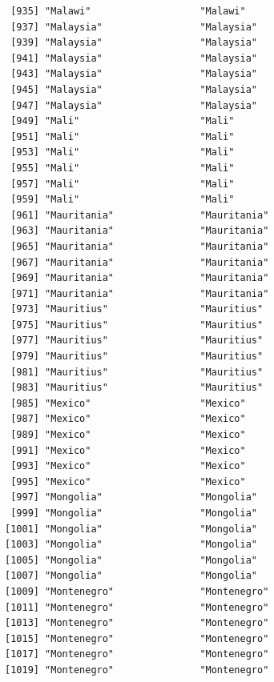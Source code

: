 \documentclass[
  letterpaper,
  DIV=11,
  numbers=noendperiod]{scrreprt}
\begin{document}
\begin{verbatim}
 [935] "Malawi"                   "Malawi"                  
 [937] "Malaysia"                 "Malaysia"                
 [939] "Malaysia"                 "Malaysia"                
 [941] "Malaysia"                 "Malaysia"                
 [943] "Malaysia"                 "Malaysia"                
 [945] "Malaysia"                 "Malaysia"                
 [947] "Malaysia"                 "Malaysia"                
 [949] "Mali"                     "Mali"                    
 [951] "Mali"                     "Mali"                    
 [953] "Mali"                     "Mali"                    
 [955] "Mali"                     "Mali"                    
 [957] "Mali"                     "Mali"                    
 [959] "Mali"                     "Mali"                    
 [961] "Mauritania"               "Mauritania"              
 [963] "Mauritania"               "Mauritania"              
 [965] "Mauritania"               "Mauritania"              
 [967] "Mauritania"               "Mauritania"              
 [969] "Mauritania"               "Mauritania"              
 [971] "Mauritania"               "Mauritania"              
 [973] "Mauritius"                "Mauritius"               
 [975] "Mauritius"                "Mauritius"               
 [977] "Mauritius"                "Mauritius"               
 [979] "Mauritius"                "Mauritius"               
 [981] "Mauritius"                "Mauritius"               
 [983] "Mauritius"                "Mauritius"               
 [985] "Mexico"                   "Mexico"                  
 [987] "Mexico"                   "Mexico"                  
 [989] "Mexico"                   "Mexico"                  
 [991] "Mexico"                   "Mexico"                  
 [993] "Mexico"                   "Mexico"                  
 [995] "Mexico"                   "Mexico"                  
 [997] "Mongolia"                 "Mongolia"                
 [999] "Mongolia"                 "Mongolia"                
[1001] "Mongolia"                 "Mongolia"                
[1003] "Mongolia"                 "Mongolia"                
[1005] "Mongolia"                 "Mongolia"                
[1007] "Mongolia"                 "Mongolia"                
[1009] "Montenegro"               "Montenegro"              
[1011] "Montenegro"               "Montenegro"              
[1013] "Montenegro"               "Montenegro"              
[1015] "Montenegro"               "Montenegro"              
[1017] "Montenegro"               "Montenegro"              
[1019] "Montenegro"               "Montenegro"              

\end{verbatim}
\end{document}
